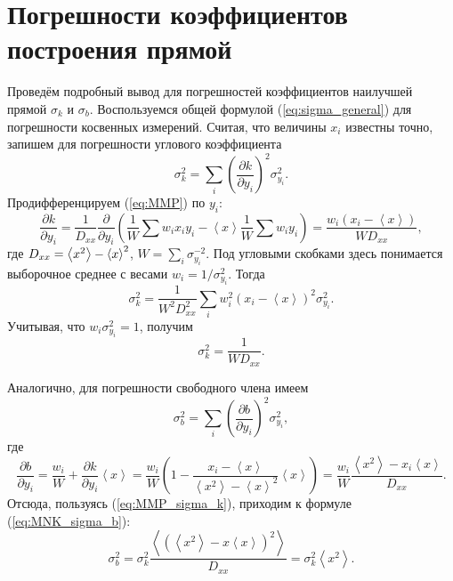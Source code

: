 \section{Погрешности коэффициентов построения прямой}\label{sec:sigma_kb}

Проведём подробный вывод для погрешностей коэффициентов наилучшей
прямой $\sigma_{k}$ и $\sigma_{b}$. Воспользуемся общей формулой
(\ref{eq:sigma_general}) для погрешности косвенных измерений. Считая,
что величины $x_{i}$ известны точно, запишем для погрешности углового
коэффициента
\[
\sigma_{k}^{2}=\sum\limits _{i}\left(\frac{\partial k}{\partial y_{i}}\right)^{2}\sigma_{y_{i}}^{2}.
\]
Продифференцируем (\ref{eq:MMP}) по $y_{i}$:
\[
\frac{\partial k}{\partial y_{i}}=\frac{1}{D_{xx}}\frac{\partial}{\partial y_{i}}\left(\frac{1}{W}\sum w_{i}x_{i}y_{i}-\left\langle x\right\rangle \frac{1}{W}\sum w_{i}y_{i}\right)=\frac{w_{i}\left(x_{i}-\left\langle x\right\rangle \right)}{WD_{xx}},
\]
где $D_{xx}=\left<x^{2}\right> -\left<x\right>^{2}$, $W=\sum_i \sigma_{y_i}^{-2}$.
Под угловыми скобками здесь понимается выборочное среднее с весами $w_i=1/\sigma_{y_i}^2$.
Тогда
\[
\sigma_{k}^{2}=\frac{1}{W^{2}D_{xx}^{2}}\sum\limits _{i}w_{i}^{2}\left(x_{i}-\left\langle x\right\rangle \right)^{2}\sigma_{y_{i}}^{2}.
\]
Учитывая, что $w_{i}\sigma_{y_{i}}^{2}=1$, получим
\begin{equation}
\sigma_{k}^{2}=\frac{1}{W D_{xx}}.\label{eq:MMP_sigma_k}
\end{equation}

Аналогично, для погрешности свободного члена имеем
\[
\sigma_{b}^{2}=\sum_{i}\left(\frac{\partial b}{\partial y_{i}}\right)^{2}\sigma_{y_{i}}^{2},
\]
где 
\[
\frac{\partial b}{\partial y_{i}}=\frac{w_{i}}{W}+\frac{\partial k}{\partial y_{i}}\left\langle x\right\rangle =\frac{w_{i}}{W}\left(1-\frac{x_{i}-\left\langle x\right\rangle }{\left\langle x^{2}\right\rangle -\left\langle x\right\rangle ^{2}}\left\langle x\right\rangle \right)=\frac{w_{i}}{W}\frac{\left\langle x^{2}\right\rangle -x_{i}\left\langle x\right\rangle }{D_{xx}}.
\]
Отсюда, пользуясь (\ref{eq:MMP_sigma_k}), приходим к формуле (\ref{eq:MNK_sigma_b}):
\begin{equation}
\sigma_{b}^{2}=\sigma_{k}^{2}
\frac{\left\langle \left(\left\langle x^{2}\right\rangle -x\left\langle x\right\rangle \right)^{2}\right\rangle }%
{D_{xx}}=
\sigma_{k}^{2}\left\langle x^{2}\right\rangle .
\end{equation}

